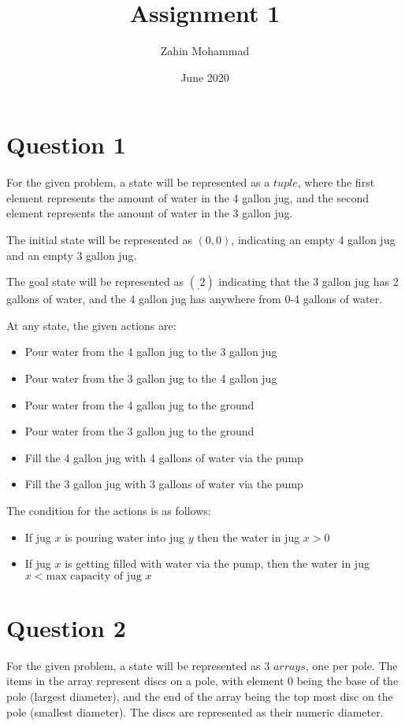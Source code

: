 \documentclass{article}
\title{Assignment 1}
\author{Zahin Mohammad}
\date{June 2020}
\begin{document}
\maketitle
\section{Question 1}
For the given problem, a state will be represented as a $tuple$, where the first element represents the amount of water in the 4 gallon jug, and the second element represents the amount of water in the 3 gallon jug. 
\setlength{\parskip}{6pt}

The initial state will be represented as $(0,0)$, indicating an empty 4 gallon jug and an empty 3 gallon jug. 
\setlength{\parskip}{6pt}

The goal state will be represented as $(_,2)$ indicating that the 3 gallon jug has 2 gallons of water, and the 4 gallon jug has anywhere from 0-4 gallons of water.

At any state, the given actions are:
\begin{itemize}
    \item Pour water from the 4 gallon jug to the 3 gallon jug 
    \item Pour water from the 3 gallon jug to the 4 gallon jug
    \item Pour water from the 4 gallon jug to the ground
    \item Pour water from the 3 gallon jug to the ground
    \item Fill the 4 gallon jug with 4 gallons of water via the pump
    \item Fill the 3 gallon jug with 3 gallons of water via the pump
\end{itemize}

The condition for the actions is as follows:
\begin{itemize}
    \item If jug $x$ is pouring water into jug $y$ then the water in jug $x>0$
    \item If jug $x$ is getting filled with water via the pump, then the water in jug $x < \mbox{max capacity of jug } x$
\end{itemize}

\section{Question 2}
For the given problem, a state will be represented as 3 $arrays$, one per pole. The items in the array represent discs on a pole, with element $0$ being the base of the pole (largest diameter), and the end of the array being the top most disc on the pole (smallest diameter). The discs are represented as their numeric diameter.
\setlength{\parskip}{6pt}
\end{document}
